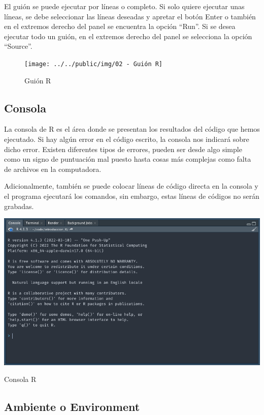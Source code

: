 \documentclass[]{tufte-handout}
\begin{document}
El guión se puede ejecutar por líneas o completo. Si solo quiere
ejecutar unas líneas, se debe seleccionar las líneas deseadas y apretar
el botón Enter o también en el extremos derecho del panel se encuentra
la opción ``Run''. Si se desea ejecutar todo un guión, en el extremos
derecho del panel se selecciona la opción ``Source''.

\begin{figure}
\texttt{[image: ../../public/img/02 - Guión R]} \caption[Guión R]{Guión R}\label{fig:unnamed-chunk-2}
\end{figure}

\hypertarget{consola}{%
\subsection{Consola}\label{consola}}

La consola de R es el área donde se presentan los resultados del código
que hemos ejecutado. Si hay algún error en el código escrito, la consola
nos indicará sobre dicho error. Existen diferentes tipos de errores,
pueden ser desde algo simple como un signo de puntuación mal puesto
hasta cosas más complejas como falta de archivos en la computadora.

Adicionalmente, también se puede colocar líneas de código directa en la
consola y el programa ejecutará los comandos, sin embargo, estas líneas
de códigos no serán grabadas.

\begin{marginfigure}
\includegraphics[width=12.76in]{../../public/img/02 - consola R} \caption[Consola R]{Consola R}\label{fig:unnamed-chunk-3}
\end{marginfigure}

\hypertarget{ambiente-o-environment}{%
\subsection{Ambiente o Environment}\label{ambiente-o-environment}}
\end{document}
